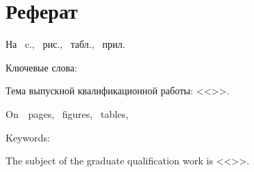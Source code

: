 \chapter*[Count-me]{Реферат} %
\thispagestyle{empty}%
%
%




На ~c.,  
~{рис.},
~{табл.},
~{прил.}%



{Ключевые слова: \keywordsRu} %

Тема выпускной квалификационной работы: <<\thesisTitle>>. %


\abstractRu %



\printTheAbstract %


On~~pages,
~figures,
~tables,
~%

{Keywords: \keywordsEn} %
	
The subject of the graduate qualification work is <<\thesisTitleEn>>.
	
	
\abstractEn %
	


\thispagestyle{empty}
%
